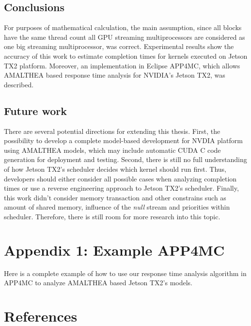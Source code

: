 \documentclass[
  12pt,
  a4paperpaper,
]{report}
\begin{document}
\hypertarget{conclusions}{%
\section{Conclusions}\label{conclusions}}

For purposes of mathematical calculation, the main assumption, since all blocks have the same thread count all GPU streaming multiprocessors are considered as one big streaming multiprocessor, was correct.
Experimental results show the accuracy of this work to estimate completion times for kernels executed on Jetson TX2 platform.
Moreover, an implementation in Eclipse APP4MC, which allows AMALTHEA based response time analysis for NVIDIA's Jetson TX2, was described.

\hypertarget{future-work}{%
\section{Future work}\label{future-work}}

There are several potential directions for extending this thesis. First,
the possibility to develop a complete model-based development for NVDIA
platform using AMALTHEA models, which may include automatic CUDA C code
generation for deployment and testing. Second, there is still no full
understanding of how Jetson TX2's scheduler decides which kernel should
run first. Thus, developers should either consider all possible cases
when analyzing completion times or use a reverse engineering approach to Jetson TX2's
scheduler. Finally, this work didn't consider memory transaction and other
constrains such as amount of shared memory, influence of the \emph{null}
stream and priorities within scheduler. Therefore, there is still room
for more research into this topic.

\hypertarget{appendix-1-example-app4mc}{%
\chapter*{Appendix 1: Example APP4MC}\label{appendix-1-example-app4mc}}

Here is a complete example of how to use our response time analysis
algorithm in APP4MC to analyze AMALTHEA based Jetson TX2's models.



\footnotesize

\hypertarget{references}{%
\chapter*{References}\label{references}}
\end{document}
